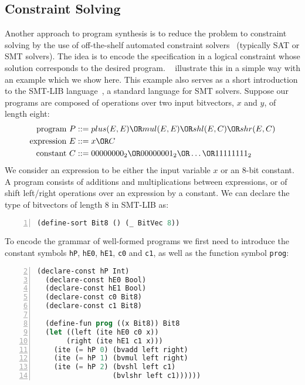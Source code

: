 \subsection{Constraint Solving}
\label{sec:constraint-solving}

Another approach to program synthesis is to reduce the problem to
constraint solving by the use of off-the-shelf automated constraint
solvers~\cite{Shi:2019:FCS,Feng:2018:PSU,Feng:2017:CST,Feng:2017:CSC,Solar-Lezama:2008,Jha:oracle:2010}
(typically SAT or SMT solvers).
The idea is to encode the specification in a logical constraint whose solution
corresponds to the desired program.
\citeauthor{Gulwani2017}~\cite{Gulwani2017} illustrate this in a simple way with
an example which we show here.
This example also serves as a short introduction to the SMT-LIB
language~\cite{BarFT-RR-17}, a standard language for SMT solvers.
Suppose our programs are composed of operations over two input bitvectors, $x$
and $y$, of length eight:
%
\begin{align*}
  \text{program }P    &::= plus(E,E) \OR mul(E,E) \OR shl(E,C) \OR shr(E,C)    \\
  \text{expression }E &::= x \OR C                                             \\
  \text{constant }C   &::= 00000000_2 \OR 00000001_2 \OR \ldots \OR 11111111_2 \\
\end{align*}
%
\noindent
We consider an expression to be either the input variable $x$ or an 8-bit
constant.
A program consists of additions and multiplications between expressions, or of
shift left/right operations over an expression by a constant.
We can declare the type of bitvectors of length 8 in SMT-LIB as:
%
\begin{lstlisting}[language=Lisp,numbers=left,
  firstnumber=1,
  morekeywords={define-sort},
  xleftmargin=.2\textwidth, xrightmargin=.2\textwidth]
  (define-sort Bit8 () (_ BitVec 8))
\end{lstlisting}
%
\noindent
To encode the grammar of well-formed programs we first need to introduce the
constant symbols \texttt{hP}, \texttt{hE0}, \texttt{hE1}, \texttt{c0} and
\texttt{c1}, as well as the function symbol \texttt{prog}:
%
\begin{lstlisting}[language=Lisp,
  numbers=left,
  firstnumber=2,
  morekeywords={declare-const,define-fun,ite},
  xleftmargin=.2\textwidth, xrightmargin=.2\textwidth]
  (declare-const hP Int)
  (declare-const hE0 Bool)
  (declare-const hE1 Bool)
  (declare-const c0 Bit8)
  (declare-const c1 Bit8)

  (define-fun prog ((x Bit8)) Bit8
  (let ((left (ite hE0 c0 x))
       (right (ite hE1 c1 x)))
    (ite (= hP 0) (bvadd left right)
    (ite (= hP 1) (bvmul left right)
    (ite (= hP 2) (bvshl left c1)
                  (bvlshr left c1))))))
\end{lstlisting}
